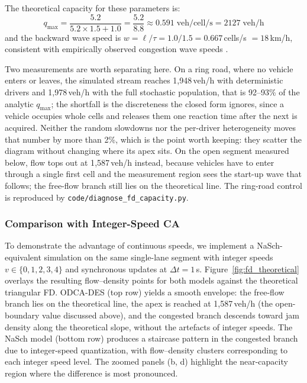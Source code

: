 \documentclass[review,number]{elsarticle} %
\begin{document}
The theoretical capacity for these parameters is:
\begin{equation}
    q_{\max} = \frac{5.2}{5.2 \times 1.5 + 1.0} = \frac{5.2}{8.8} \approx 0.591\;\text{veh/cell/s} = 2127\;\text{veh/h}
\end{equation}
and the backward wave speed is $w = \ell/\tau = 1.0/1.5 = 0.667$\,cells/s $= 18$\,km/h, consistent with empirically observed congestion wave speeds \citep{cassidy1998bivariate}.

Two measurements are worth separating here. On a ring road, where no vehicle enters or leaves, the simulated stream reaches 1{,}948\,veh/h with deterministic drivers and 1{,}978\,veh/h with the full stochastic population, that is 92--93\% of the analytic $q_{\max}$; the shortfall is the discreteness the closed form ignores, since a vehicle occupies whole cells and releases them one reaction time after the next is acquired. Neither the random slowdowns nor the per-driver heterogeneity moves that number by more than 2\%, which is the point worth keeping: they scatter the diagram without changing where its apex sits. On the open segment measured below, flow tops out at 1{,}587\,veh/h instead, because vehicles have to enter through a single first cell and the measurement region sees the start-up wave that follows; the free-flow branch still lies on the theoretical line. The ring-road control is reproduced by \texttt{code/diagnose\_fd\_capacity.py}.

\subsubsection{Comparison with Integer-Speed CA}

To demonstrate the advantage of continuous speeds, we implement a NaSch-equivalent simulation on the same single-lane segment with integer speeds $v \in \{0, 1, 2, 3, 4\}$ and synchronous updates at $\Delta t = 1$\,s. Figure~\ref{fig:fd_theoretical} overlays the resulting flow--density points for both models against the theoretical triangular FD. ODCA-DES (top row) yields a smooth envelope: the free-flow branch lies on the theoretical line, the apex is reached at 1{,}587\,veh/h (the open-boundary value discussed above), and the congested branch descends toward jam density along the theoretical slope, without the artefacts of integer speeds. The NaSch model (bottom row) produces a staircase pattern in the congested branch due to integer-speed quantization, with flow--density clusters corresponding to each integer speed level. The zoomed panels (b, d) highlight the near-capacity region where the difference is most pronounced.
\end{document}
